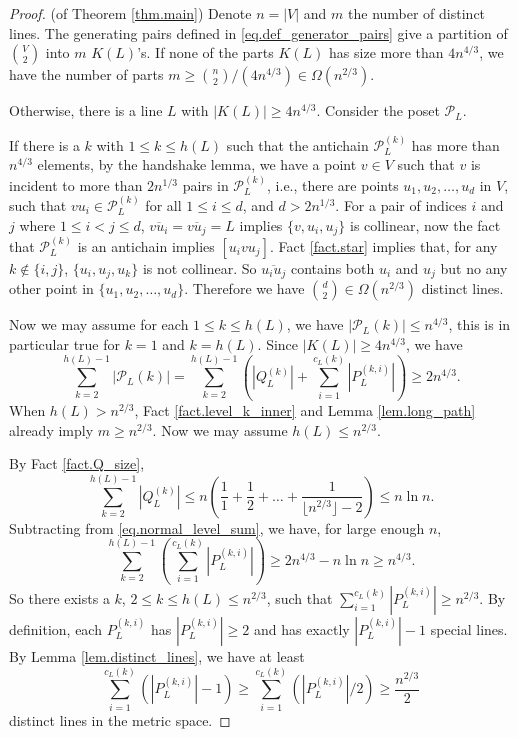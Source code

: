 \documentclass[12pt]{article}
\newcommand{\ov}{\overline}
\begin{document}
\begin{proof} (of Theorem \ref{thm.main})
Denote $n = |V|$ and $m$ the number of distinct lines.
The generating pairs defined in \eqref{eq.def_generator_pairs} give a partition of $\binom{V}{2}$
into $m$ $K(L)$'s. If none of the parts $K(L)$ has size more than $4n^{4/3}$, we have
the number of parts $m \geq \binom{n}{2} / (4n^{4/3}) \in \Omega(n^{2/3})$.

Otherwise, there is a line $L$ with $|K(L)| \ge 4n^{4/3}$.
Consider the poset $\mathcal{P}_L$.

If there is a $k$ with $1 \le k \le h(L)$ such that the antichain $\mathcal{P}_L^{(k)}$ has more than $n^{4/3}$
elements, by the handshake lemma, we have a point $v \in V$ such that $v$ is incident to more than
$2n^{1/3}$ pairs in $\mathcal{P}_L^{(k)}$, i.e., there are points $u_1, u_2, \dots, u_d$
in $V$, such that $vu_i \in \mathcal{P}_L^{(k)}$ for all $1 \le i \le d$, and $d > 2n^{1/3}$.
For a pair of indices $i$ and $j$ where $1 \le i < j \le d$, $\ov{vu_i} = \ov{vu_j} = L$ implies $\{v, u_i, u_j\}$ is collinear,
now the fact that $\mathcal{P}_L^{(k)}$ is an antichain implies $[u_ivu_j]$.
Fact \ref{fact.star} implies that, for any $k \not\in \{i, j\}$, $\{u_i, u_j, u_k\}$
is not collinear. So $\ov{u_iu_j}$ contains both $u_i$ and $u_j$ but no any other point
in $\{u_1, u_2, \dots, u_d\}$. Therefore we have $\binom{d}{2} \in \Omega(n^{2/3})$ distinct lines.

Now we may assume for each $1 \le k \le h(L)$, we have $|\mathcal{P}_L{(k)}| \le n^{4/3}$,
this is in particular true for $k = 1$ and $k = h(L)$. Since $|K(L)| \ge 4n^{4/3}$,
we have
\begin{equation}\label{eq.normal_level_sum}
\sum_{k=2}^{h(L)-1} \left|\mathcal{P}_L{(k)}\right| = 
\sum_{k=2}^{h(L)-1} \left( \left|Q_L^{(k)} \right| + \sum_{i=1}^{c_L(k)} \left|P_L^{(k, i)}\right| \right)
\ge 2n^{4/3}.
\end{equation}
When $h(L) > n^{2/3}$, Fact \ref{fact.level_k_inner} and Lemma \ref{lem.long_path}
already imply $m \ge n^{2/3}$. Now we may assume $h(L) \le n^{2/3}$.

By Fact \ref{fact.Q_size},
\[
\sum_{k=2}^{h(L)-1} \left|Q_L^{(k)} \right| \le n \left( \frac{1}{1} + \frac{1}{2} + \dots + \frac{1}{\lfloor n^{2/3} \rfloor - 2} \right) \le n\ln n.
\]
Subtracting from \eqref{eq.normal_level_sum}, we have, for large enough $n$,
\[
\sum_{k=2}^{h(L)-1} \left( \sum_{i=1}^{c_L(k)} \left|P_L^{(k, i)}\right|\right)
\ge 2n^{4/3} - n \ln n \ge n^{4/3}.
\]
So there exists a $k$, $2 \le k \le h(L) \le n^{2/3}$, such that
$\sum_{i=1}^{c_L(k)} \left|P_L^{(k, i)}\right| \ge n^{2/3}$.
By definition, each $P_L^{(k, i)}$ has $|P_L^{(k, i)}| \ge 2$
and has exactly $|P_L^{(k, i)}| - 1$ special lines.
By Lemma \ref{lem.distinct_lines}, we have at least
\[
\sum_{i=1}^{c_L(k)} \left( \left|P_L^{(k, i)}\right|-1 \right) 
\ge \sum_{i=1}^{c_L(k)} \left(\left|P_L^{(k, i)}\right| / 2 \right) 
 \ge \frac{n^{2/3}}{2}
\] 
distinct lines in the metric space.
\end{proof}
\end{document}
